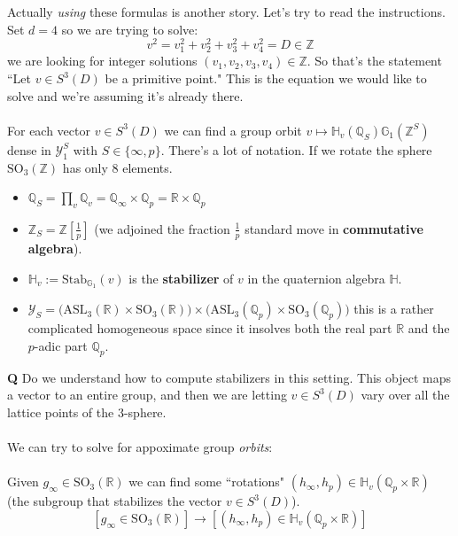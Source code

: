\documentclass[12pt]{article}
\begin{document}
{\begin{thebibliography}{}
\end{thebibliography}

\newpage

\noindent Actually \textit{using} these formulas is another story.  Let's try to read the instructions.  Set $d = 4$ so we are trying to solve:
$$ v^2 = v_1^2 + v_2^2 + v_3^2 + v_4^2 = D \in \mathbb{Z} $$ 
we are looking for integer solutions $(v_1, v_2, v_3, v_4) \in \mathbb{Z}$.  So that's the statement  ``Let $v \in S^3(D)$ be a primitive point."  This is the equation we would like to solve and we're assuming it's already there.\\ \\
For each vector $v \in S^3(D)$ we can find a group orbit $v \mapsto \mathbb{H}_v(\mathbb{Q}_S) \mathbb{G}_1(\mathbb{Z}^S)$ dense in $\mathcal{Y}_1^S$ with $S \in \{ \infty, p\}$. There's a lot of notation.  If we rotate the sphere $\text{SO}_3(\mathbb{Z})$ has only 8 elements.  
\begin{itemize}
\item $\mathbb{Q}_S = \prod_v \mathbb{Q}_v = \mathbb{Q}_\infty \times \mathbb{Q}_p = \mathbb{R} \times \mathbb{Q}_p$ 
\item $\mathbb{Z}_S = \mathbb{Z}[\frac{1}{p}] $ (we adjoined the fraction $\frac{1}{p}$ standard move in \textbf{commutative algebra}).
\item $\mathbb{H}_v := \text{Stab}_{\mathbb{G}_1}(v)$ is the \textbf{stabilizer} of $v$ in the quaternion algebra $\mathbb{H}$.
\item $\mathcal{Y}_S = \big(\text{ASL}_3(\mathbb{R})\times \text{SO}_3(\mathbb{R})\big) \times \big(\text{ASL}_3( \mathbb{Q}_p )\times \text{SO}_3(\mathbb{Q}_p)\big)$
this is a rather complicated homogeneous space since it insolves both the real part $\mathbb{R}$ and the $p$-adic part $\mathbb{Q}_p$. \end{itemize}
\textbf{Q} Do we understand how to compute stabilizers in this setting.  This object maps a vector to an entire group, and then we are letting $v \in S^3(D)$ vary over all the lattice points of the $3$-sphere. \\ \\
We can try to solve for appoximate group \textit{orbits}: \\ \\
Given $g_\infty \in \text{SO}_3(\mathbb{R}) $ we can find some ``rotations" $(h_\infty, h_p) \in \mathbb{H}_v(\mathbb{Q}_p \times \mathbb{R})  $ (the subgroup that stabilizes the vector $v \in S^3(D)$).
$$ [g_\infty \in \text{SO}_3(\mathbb{R})] \to [ (h_\infty, h_p) \in \mathbb{H}_v(\mathbb{Q}_p \times \mathbb{R}) ] $$
}
\end{document}
